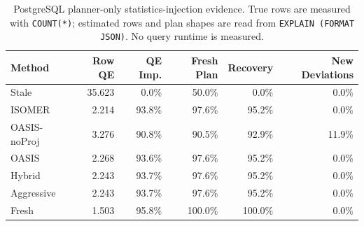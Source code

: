 \begin{table}[t]
  \centering
  \small
  \caption{PostgreSQL planner-only statistics-injection evidence. True rows are measured with \texttt{COUNT(*)}; estimated rows and plan shapes are read from \texttt{EXPLAIN (FORMAT JSON)}. No query runtime is measured.}
  \label{tab:postgres_planner_stats_injection}
  \setlength{\tabcolsep}{4pt}
  \begin{tabular}{lrrrrr}
    \toprule
    Method & Row QE & QE Imp. & Fresh Plan & Recovery & New Deviations \\
    \midrule
    Stale & 35.623 & 0.0\% & 50.0\% & 0.0\% & 0.0\% \\
    ISOMER & 2.214 & 93.8\% & 97.6\% & 95.2\% & 0.0\% \\
    OASIS-noProj & 3.276 & 90.8\% & 90.5\% & 92.9\% & 11.9\% \\
    OASIS & 2.268 & 93.6\% & 97.6\% & 95.2\% & 0.0\% \\
    Hybrid & 2.243 & 93.7\% & 97.6\% & 95.2\% & 0.0\% \\
    Aggressive & 2.243 & 93.7\% & 97.6\% & 95.2\% & 0.0\% \\
    Fresh & 1.503 & 95.8\% & 100.0\% & 100.0\% & 0.0\% \\
    \bottomrule
  \end{tabular}
\end{table}
